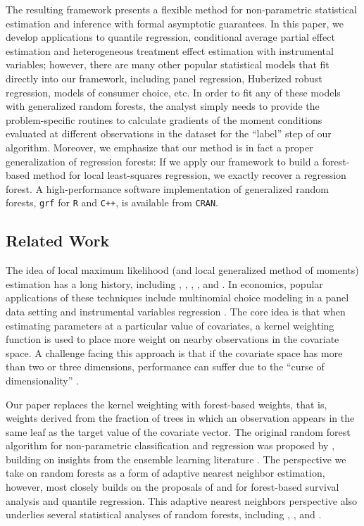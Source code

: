 \documentclass[aos]{imsart}
\theoremstyle{plain}
\theoremstyle{definition}
\theoremstyle{remark}
\begin{document}
\begin{CJK}{UTF8}{gbsn}
The resulting framework presents a flexible method for non-parametric
statistical estimation and inference with formal asymptotic guarantees.
In this paper, we develop applications to quantile regression, conditional average partial
effect estimation and heterogeneous treatment effect estimation with instrumental variables; however,
there are many other popular statistical models that fit directly into our framework,
including panel regression, Huberized robust regression, models of consumer choice, etc.
In order to fit any of these models with generalized random forests,
the analyst simply needs to provide the problem-specific routines to calculate gradients of the
moment conditions evaluated at different observations in the dataset for the ``label'' step of our algorithm.
Moreover, we emphasize that our method is in fact
a proper generalization of regression forests: If we apply our framework to build a forest-based method for
local least-squares regression, 
we exactly recover a regression forest.
A high-performance software implementation of generalized random forests,
\texttt{grf} for \texttt{R} and \texttt{C++}, is available from \texttt{CRAN}.

\subsection{Related Work}

The idea of local maximum likelihood (and local generalized method of moments) estimation has a long history,
including \citet{fan1998local}, \citet{newey1994kernel}, \citet{staniswalis1989kernel}, \citet{stone1977consistent},
\citet{tibshirani1987local} and \citet{lewbel2007local}. In economics, popular applications of these techniques include
multinomial choice modeling in a panel data setting \citep[e.g.,][]{honore2000panel} and instrumental variables
regression \citep[e.g.,][]{su2013local}. The core idea is that when estimating
parameters at a particular value of covariates, a kernel weighting function is used to place more weight on nearby observations
in the covariate space. A challenge facing this approach is that if the covariate space has more than two or three dimensions, performance can suffer due to the ``curse of dimensionality'' \citep[e.g.,][]{robins1997toward}.

Our paper replaces the kernel weighting with forest-based weights, that is,
weights derived from the fraction of trees in which an observation
appears in the same leaf as the target value of the covariate vector.  The original random
forest algorithm for non-parametric classification and regression
was proposed by \citet{breiman2001random}, building on insights from the ensemble learning
literature \citep{amit1997shape,breiman1996bagging,dietterich2000experimental,ho1998random}.
The perspective we take on random forests as a form of
adaptive nearest neighbor estimation, however, most closely builds on the proposals of
\citet{hothorn2004bagging} and \citet{meinshausen2006quantile} for forest-based survival
analysis and quantile regression. This adaptive
nearest neighbors perspective also underlies several statistical analyses of random forests,
including \citet{arlot2014analysis}, \citet{biau2010layered}, and \citet{lin2006random}.


\end{CJK}
\end{document}
